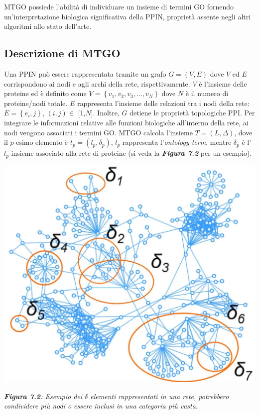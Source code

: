 \documentclass[11pt]{article}
\begin{document}
MTGO possiede l'abilità di individuare un insieme di termini GO fornendo un'interpretazione biologica significativa della PPIN, proprietà assente negli altri algoritmi allo stato dell'arte.\\

\subsection{Descrizione di MTGO}
Una PPIN può essere rappresentata tramite un grafo $G = (V,E)$ dove $V$ ed $E$ corrispondono ai nodi e agli archi della rete, rispettivamente. $V$ è l'insieme delle proteine ed è definito come $V =\left \{v_1, v_2, v_3, ..., v_N\right \}$ dove $N$ è il numero di proteine/nodi totale. $E$ rappresenta l'insieme delle relazioni tra i nodi della rete: $E = \left \{e_i,j\right \}$, $(i,j) \in$ [1,$N$]. Inoltre, $G$ detiene le proprietà topologiche PPI. Per integrare le informazioni relative alle funzioni biologiche all'interno della rete, ai nodi vengono associati i termini GO. MTGO calcola l'insieme $T = (L, \Delta)$, dove il $p$-esimo elemento è $t_p = (l_p, \delta_p)$, $l_p$ rappresenta l'\textit{ontology term}, mentre $\delta_p$ è l'$l_p$-insieme associato alla rete di proteine (si veda la \textit{\textbf{Figura 7.2}} per un esempio).

\begin{center}
\includegraphics[scale=0.4]{delta}

\begin{small}\textit{\textbf{Figura 7.2}: Esempio dei $\delta$ elementi rappresentati in una rete, potrebbero condividere più nodi o essere inclusi in una categoria più vasta}.\end{small}
\end{center}
\end{document}
